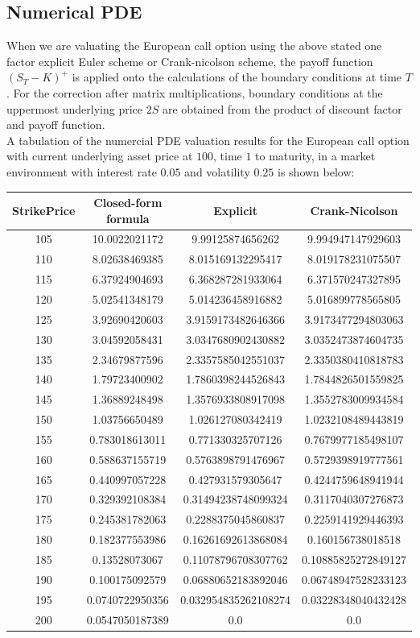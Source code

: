 \subsection{Numerical PDE}
When we are valuating the European call option using the above stated one factor explicit Euler scheme or Crank-nicolson scheme, the payoff function $(S_{T} - K)^{+}$ is applied onto the calculations of the boundary conditions at time $T$. For the correction after matrix multiplications, boundary conditions at the uppermost underlying price $2S$ are obtained from the product of discount factor and payoff function.\\[1mm]
A tabulation of the numercial PDE valuation results for the European call option with current underlying asset price at $100$, time $1$ to maturity, in a market environment with interest rate $0.05$ and volatility $0.25$ is shown below:
\begin{center}
\begin{tabular}{|c|c|c|c|}
\hline
StrikePrice & Closed-form formula & Explicit & Crank-Nicolson\\
\hline
105 & 10.0022021172&   9.99125874656262 &     9.994947147929603 \\
110 & 8.02638469385&   8.015169132295417 &    8.019178231075507 \\
115 & 6.37924904693&   6.368287281933064 &    6.371570247327895 \\
120 & 5.02541348179&   5.014236458916882 &    5.016899778565805 \\
125 & 3.92690420603&   3.9159173482646366 &   3.9173477294803063 \\
130 & 3.04592058431&   3.0347680902430882 &   3.0352473874604735 \\
135 & 2.34679877596&   2.3357585042551037 &   2.3350380410818783 \\
140 & 1.79723400902&   1.7860398244526843 &   1.7844826501559825 \\
145 & 1.36889248498&   1.3576933808917098 &   1.3552783009934584 \\
150 & 1.03756650489&   1.026127080342419 &    1.0232108489443819 \\
155 & 0.783018613011&  0.771330325707126 &    0.7679977185498107 \\
160 & 0.588637155719&  0.5763898791476967 &   0.5729398919777561 \\
165 & 0.440997057228&  0.427931579305647 &    0.4244759648941944 \\
170 & 0.329392108384&  0.31494238748099324 &  0.3117040307276873 \\
175 & 0.245381782063&  0.2288375045860837 &   0.2259141929446393 \\
180 & 0.182377553986&  0.16261692613868084 &  0.160156738018518 \\
185 & 0.13528073067&   0.11078796708307762 &  0.10885825272849127 \\
190 & 0.100175092579&  0.06880652183892046 &  0.06748947528233123 \\
195 & 0.0740722950356& 0.032954835262108274 & 0.03228348040432428 \\
200 & 0.0547050187389& 0.0 &                  0.0 \\
\hline
\end{tabular}
\end{center}

